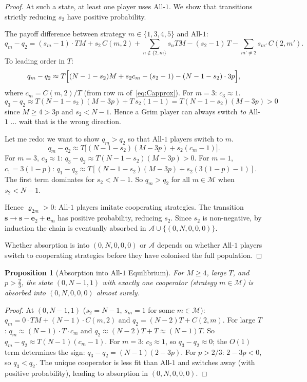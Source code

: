 \documentclass[12pt,a4paper]{article}
\newtheorem{proposition}{Proposition}[section]
\begin{document}
\begin{proof}
At such a state, at least one player uses All-$1$.  We show that transitions
strictly reducing $s_2$ have positive probability.

The payoff difference between strategy $m\in\{1,3,4,5\}$ and All-$1$:
\[
  q_m-q_2 = (s_m-1)\cdot TM + s_2\,C(m,2) + \sum_{n\notin\{2,m\}} s_n TM
           - (s_2-1)\,T - \sum_{m'\neq 2} s_{m'}\,C(2,m').
\]
To leading order in $T$:
\[
  q_m-q_2 \approx T\Bigl[(N-1-s_2)M + s_2 c_m - (s_2-1) - (N-1-s_2)\cdot 3p\Bigr],
\]
where $c_m=C(m,2)/T$ (from row $m$ of~\eqref{eq:Capprox}).
For $m=3$: $c_3\approx 1$.
\[
  q_3-q_2 \approx T(N-1-s_2)(M-3p) + T\,s_2(1-1) = T(N-1-s_2)(M-3p)>0
\]
since $M\geq 4>3p$ and $s_2<N-1$.  Hence a Grim player can always switch
\emph{to} All-$1$ ... wait that is the wrong direction.

Let me redo: we want to show $q_m > q_2$ so that All-$1$ players switch to $m$.
\[
  q_m - q_2 \approx T\bigl[(N-1-s_2)(M-3p) + s_2(c_m - 1)\bigr].
\]
For $m=3$, $c_3\approx 1$: $q_3-q_2\approx T(N-1-s_2)(M-3p)>0$.
For $m=1$, $c_1=3(1-p)$: $q_1-q_2\approx T[(N-1-s_2)(M-3p)+s_2(3(1-p)-1)]$.
The first term dominates for $s_2<N-1$.  So $q_m>q_2$ for all
$m\in\mathcal{M}$ when $s_2<N-1$.

Hence $\varrho_{2m}>0$: All-$1$ players imitate cooperating strategies.  The
transition $\mathbf{s}\to\mathbf{s}-\mathbf{e}_2+\mathbf{e}_m$ has positive
probability, reducing $s_2$.  Since $s_2$ is non-negative, by induction the
chain is eventually absorbed in $\mathcal{A}\cup\{(0,N,0,0,0)\}$.

Whether absorption is into $(0,N,0,0,0)$ or $\mathcal{A}$ depends on whether
All-$1$ players switch to cooperating strategies before they have colonised the
full population.
\end{proof}

\begin{proposition}[Absorption into All-$1$ Equilibrium]\label{prop:absA1}
For $M\geq 4$, large $T$, and $p>\tfrac{2}{3}$, the state $(0,N-1,1)$ with
exactly one cooperator (strategy $m\in\mathcal{M}$) is absorbed into
$(0,N,0,0,0)$ almost surely.
\end{proposition}

\begin{proof}
At $(0,N-1,1)$ ($s_2=N-1$, $s_m=1$ for some $m\in\mathcal{M}$):
$q_m = 0\cdot TM + (N-1)\cdot C(m,2)$ and $q_2=(N-2)T+C(2,m)$.
For large $T$: $q_m\approx (N-1)\cdot T\cdot c_m$ and
$q_2\approx(N-2)T+T\approx (N-1)T$.
So $q_m-q_2\approx T(N-1)(c_m-1)$.
For $m=3$: $c_3\approx 1$, so $q_3-q_2\approx 0$; the $O(1)$ term determines
the sign: $q_3-q_2 = (N-1)(2-3p)$.  For $p>2/3$: $2-3p<0$, so $q_3<q_2$.
The unique cooperator is less fit than All-$1$ and switches away (with positive
probability), leading to absorption in $(0,N,0,0,0)$.
\end{proof}
\end{document}

